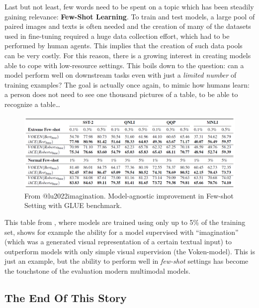 \documentclass[
]{krantz}
\begin{document}
Last but not least, few words need to be spent on a topic which has been steadily gaining relevance: \textbf{Few-Shot Learning}. To train and test models, a large pool of paired images and texts is often needed and the creation of many of the datasets used in fine-tuning required a huge data collection effort, which had to be performed by human agents. This implies that the creation of such data pools can be very costly. For this reason, there is a growing interest in creating models able to cope with low-resource settings. This boils down to the question: can a model perform well on downstream tasks even with just a \emph{limited number} of training examples? The goal is actually once again, to mimic how humans learn: a person does not need to see one thousand pictures of a table, to be able to recognize a table\ldots{}

\begin{figure}

{\centering \includegraphics[width=1\linewidth]{figures/02-03-img-support-text/img-lu2022-02} 

}

\caption{From @lu2022imagination. Model-agnostic improvement in Few-shot Setting with GLUE benchmark.}\label{fig:img-lu2022-02}
\end{figure}

This table from \citet{lu2022imagination}, where models are trained using only up to 5\% of the training set, shows for example the ability for a model supervised with ``imagination'' (which was a generated visual representation of a certain textual input) to outperform models with only simple visual supervision (the Voken-model). This is just an example, but the ability to perform well in \emph{few-shot} settings has become the touchstone of the evaluation modern multimodal models.

\hypertarget{the-end-of-this-story}{%
\subsection{The End Of This Story}\label{the-end-of-this-story}}
\end{document}
